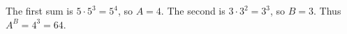 The first sum is $5\cdot5^3=5^4$, so $A=4$. The second is $3\cdot3^2=3^3$, so $B=3$. Thus $A^B=4^3=\boxed{64}$.
